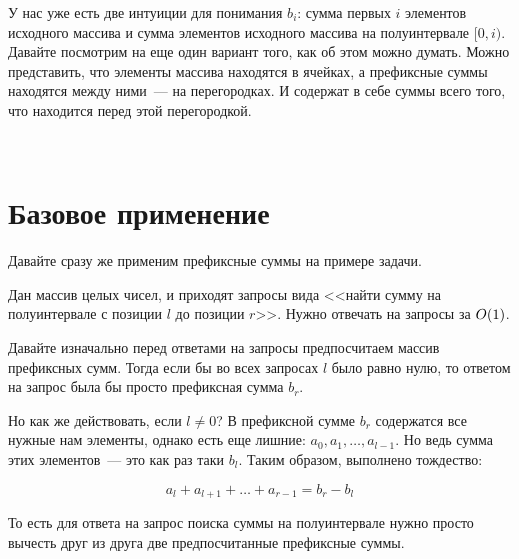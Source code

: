 \begin{clarification}
    У нас уже есть две интуиции для понимания $b_i$: сумма первых $i$ элементов исходного массива и сумма элементов исходного массива на полуинтервале $[0, i)$. Давайте посмотрим на еще один вариант того, как об этом можно думать. Можно представить, что элементы массива находятся в ячейках, а префиксные суммы находятся между ними~--- на перегородках. И содержат в себе суммы всего того, что находится перед этой перегородкой.


\




%
%
%

\end{clarification}

\section{Базовое применение}

Давайте сразу же применим префиксные суммы на примере задачи.

\begin{problem}
    Дан массив целых чисел, и приходят запросы вида <<найти сумму на полуинтервале с позиции $l$ до позиции $r$>>. Нужно отвечать на запросы за $O(1)$.
\end{problem}

\begin{solution}
    Давайте изначально перед ответами на запросы предпосчитаем массив префиксных сумм. Тогда если бы во всех запросах $l$ было равно нулю, то ответом на запрос была бы просто префиксная сумма $b_{r}$.

    Но как же действовать, если $l \neq 0$? В префиксной сумме $b_{r}$ содержатся все нужные нам элементы, однако есть еще лишние: $a_0, a_1, \ldots, a_{l - 1}$. Но ведь сумма этих элементов~--- это как раз таки $b_l$. Таким образом, выполнено тождество:

$$
a_{l} + a_{l + 1} + \ldots + a_{r - 1} = b_{r} - b_{l}
$$

То есть для ответа на запрос поиска суммы на полуинтервале нужно просто вычесть друг из друга две предпосчитанные префиксные суммы.
\end{solution}

